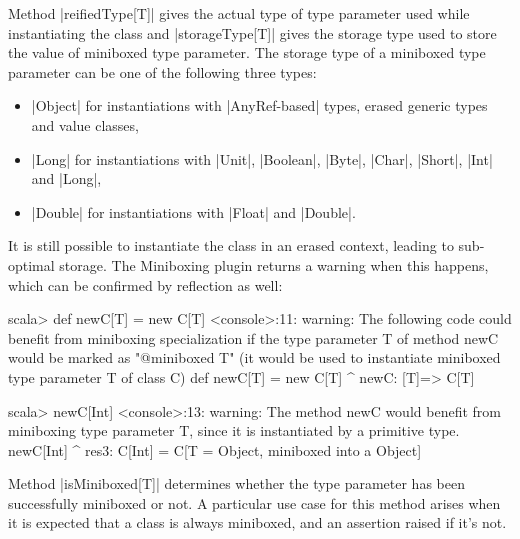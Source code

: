 Method |reifiedType[T]| gives the actual type of type parameter used while instantiating the class and |storageType[T]| gives the storage type used to store the value of miniboxed type parameter. The storage type of a miniboxed type parameter can be one of the following three types:
\begin{itemize}
	\item |Object| for instantiations with |AnyRef-based| types, erased generic types and value classes,
	\item |Long| for instantiations with |Unit|, |Boolean|, |Byte|, |Char|, |Short|, |Int| and |Long|,
	\item |Double| for instantiations with |Float| and |Double|.
\end{itemize}
It is still possible to instantiate the class in an erased context, leading to sub-optimal storage. The Miniboxing plugin returns a warning when this happens, which can be confirmed by reflection as well:

\begin{lstlisting-nobreak}
scala> def newC[T] = new C[T]
<console>:11: warning: The following code could benefit from miniboxing
     specialization if the type parameter T of method newC would be marked
     as "@miniboxed T" (it would be used to instantiate miniboxed type
     parameter T of class C)
            def newC[T] = new C[T]
                          ^
     newC: [T]=> C[T]

scala> newC[Int]
<console>:13: warning: The method newC would benefit from miniboxing
     type parameter T, since it is instantiated by a primitive type.
                   newC[Int]
                       ^
	res3: C[Int] = C[T = Object, miniboxed into a Object]
\end{lstlisting-nobreak}


Method |isMiniboxed[T]| determines whether the type parameter has been successfully miniboxed or not. A particular use case for this method arises when it is expected that a class is always miniboxed, and an assertion raised if it's not.




